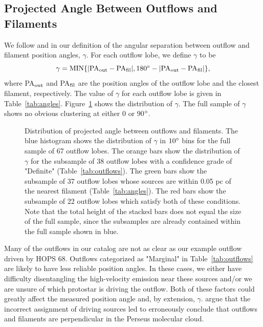 \documentclass[twocolumn]{aastex63}
\newcommand{\nlobes}{67}
\newcommand{\example}{HOPS 68}
\begin{document}
\subsection{Projected Angle Between Outflows and Filaments}\label{sec:gamma}

We follow \citet{Stephens17} and \citet{Kong19} in our definition of the angular separation between outflow and filament position angles, $\gamma$. For each outflow lobe, we define $\gamma$ to be 
\begin{equation}
    \gamma = \rm{MIN}\{|\rm{PA}_{\rm out} - \rm{PA}_{\rm fil}|, 180\degr - |\rm{PA}_{\rm out} - \rm{PA}_{\rm fil}|\},
\end{equation}
where PA$_{\rm out}$ and PA$_{\rm fil}$ are the position angles of the outflow lobe and the closest filament, respectively. The value of $\gamma$ for each outflow lobe is given in Table~\ref{tab:angles}. Figure~\ref{fig:gamma_hist} shows the distribution of $\gamma$. The full sample of $\gamma$ shows no obvious clustering at either 0 or 90$\mbox{$^\circ$}$.

\begin{figure}
\caption{Distribution of projected angle between outflows and filaments. The blue histogram shows the distribution of $\gamma$ in $10\mbox{$^\circ$}$ bins for the full sample of \nlobes{} outflow lobes. The orange bars show the distribution of $\gamma$ for the subsample of 38 outflow lobes with a confidence grade of "Definite" (Table~\ref{tab:outflows}). The green bars show the subsample of 37 outflow lobes whose sources are within 0.05 pc of the nearest filament (Table~\ref{tab:angles}). The red bars show the subsample of 22 outflow lobes which satisfy both of these conditions. Note that the total height of the stacked bars does not equal the size of the full sample, since the subsamples are already contained within the full sample shown in blue. \label{fig:gamma_hist}}
\end{figure}

Many of the outflows in our catalog are not as clear as our example outflow driven by \example{}. Outflows categorized as "Marginal" in Table~\ref{tab:outflows} are likely to have less reliable position angles. In these cases, we either have difficulty disentangling the high-velocity emission near these sources and/or we are unsure of which protostar is driving the outflow. Both of these factors could greatly affect the measured position angle and, by extension, $\gamma$. \citet{Stephens17} argue that the incorrect assignment of driving sources led \citet{Anathpindika08} to erroneously conclude that outflows and filaments are perpendicular in the Perseus molecular cloud.
\end{document}
